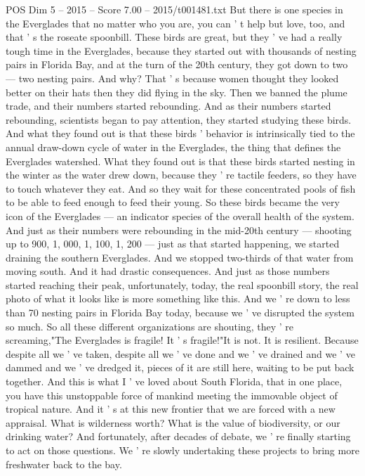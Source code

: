 \begin{textsample}{POS Dim 5 – 2015 – Score 7.00 – 2015/t001481.txt}
But there is one species in the Everglades that no matter who you are, you can ' t help but love, too, and that ' s the roseate spoonbill.
These birds are great, but they ' ve had a really tough time in the Everglades, because they started out with thousands of nesting pairs in Florida Bay, and at the turn of the 20th century, they got down to two — two nesting pairs.
And why?
That ' s because women thought they looked better on their hats then they did flying in the sky.
Then we banned the plume trade, and their numbers started rebounding.
And as their numbers started rebounding, scientists began to pay attention, they started studying these birds.
And what they found out is that these birds ' behavior is intrinsically tied to the annual draw-down cycle of water in the Everglades, the thing that defines the Everglades watershed.
What they found out is that these birds started nesting in the winter as the water drew down, because they ' re tactile feeders, so they have to touch whatever they eat.
And so they wait for these concentrated pools of fish to be able to feed enough to feed their young.
So these birds became the very icon of the Everglades — an indicator species of the overall health of the system.
And just as their numbers were rebounding in the mid-20th century — shooting up to 900, 1, 000, 1, 100, 1, 200 — just as that started happening, we started draining the southern Everglades.
And we stopped two-thirds of that water from moving south.
And it had drastic consequences.
And just as those numbers started reaching their peak, unfortunately, today, the real spoonbill story, the real photo of what it looks like is more something like this.
And we ' re down to less than 70 nesting pairs in Florida Bay today, because we ' ve disrupted the system so much.
So all these different organizations are shouting, they ' re screaming,"The Everglades is fragile!
It ' s fragile!"It is not.
It is resilient.
Because despite all we ' ve taken, despite all we ' ve done and we ' ve drained and we ' ve dammed and we ' ve dredged it, pieces of it are still here, waiting to be put back together.
And this is what I ' ve loved about South Florida, that in one place, you have this unstoppable force of mankind meeting the immovable object of tropical nature.
And it ' s at this new frontier that we are forced with a new appraisal.
What is wilderness worth?
What is the value of biodiversity, or our drinking water?
And fortunately, after decades of debate, we ' re finally starting to act on those questions.
We ' re slowly undertaking these projects to bring more freshwater back to the bay.

\end{textsample}
